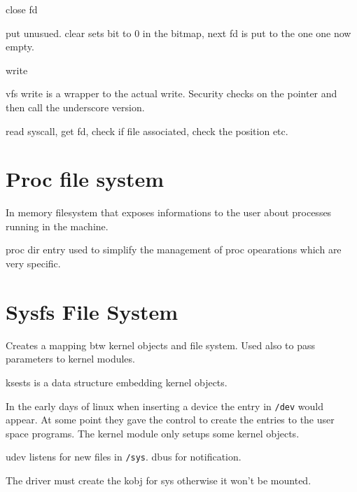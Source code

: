 \documentclass[twoside]{article}
\begin{document}
close fd

put unusued. clear sets bit to 0 in the bitmap, next fd is put to the one one
now empty.

write

vfs write is a wrapper to the actual write. Security checks on the pointer and
then call the underscore version.

read syscall, get fd, check if file associated, check the position etc.

\section{Proc file system}
\label{sec:Proc file system}

In memory filesystem that exposes informations to the user about processes
running in the machine.


proc dir entry used to simplify the management of proc opearations which are
very specific. 

\section{Sysfs File System}
\label{sec:Sysfs File System}

Creates a mapping btw kernel objects and file system. Used also to pass
parameters to kernel modules.

ksests is a data structure embedding kernel objects.


In the early days of linux when inserting a device the entry in \texttt{/dev}
would appear. At some point they gave the control to create the entries to the
user space programs. The kernel module only setups some kernel objects.

udev listens for new files in \texttt{/sys}. dbus for notification.

The driver must create the kobj for sys otherwise it won't be mounted.

\newpage


\end{document}
